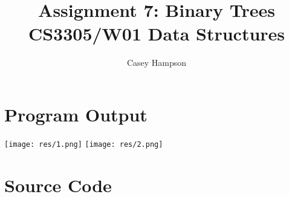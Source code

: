 \documentclass{article}
\title{Assignment 7: Binary Trees \\[8pt] CS3305/W01 Data Structures}
\author{Casey Hampson}
\begin{document}
\maketitle


\section*{Program Output}

\begin{center}
\texttt{[image: res/1.png]}
\texttt{[image: res/2.png]}
\end{center}



\pagebreak
\section*{Source Code}
\inputminted{java}{./A7.java}
\end{document}

